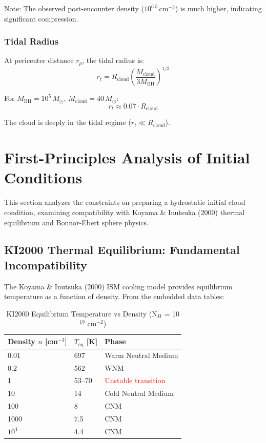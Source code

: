 \documentclass[11pt,a4paper]{article}
\newcommand{\Msun}{M_\odot}
\newcommand{\cmcubed}{\,\mathrm{cm^{-3}}}
\begin{document}
Note: The observed post-encounter density ($10^{6.5}\cmcubed$) is much higher, indicating significant compression.

\subsubsection{Tidal Radius}
At pericenter distance $r_p$, the tidal radius is:
\begin{equation}
    r_t = R_\mathrm{cloud} \left(\frac{M_\mathrm{cloud}}{3 M_\mathrm{BH}}\right)^{1/3}
\end{equation}

For $M_\mathrm{BH} = 10^5\,\Msun$, $M_\mathrm{cloud} = 40\,\Msun$:
\begin{equation}
    r_t \approx 0.07 \cdot R_\mathrm{cloud}
\end{equation}

The cloud is deeply in the tidal regime ($r_t \ll R_\mathrm{cloud}$).

\section{First-Principles Analysis of Initial Conditions}

This section analyzes the constraints on preparing a hydrostatic initial cloud
condition, examining compatibility with Koyama \& Inutsuka (2000) thermal
equilibrium and Bonnor-Ebert sphere physics.

\subsection{KI2000 Thermal Equilibrium: Fundamental Incompatibility}

The Koyama \& Inutsuka (2000) ISM cooling model provides equilibrium temperature
as a function of density. From the embedded data tables:

\begin{table}[h]
\centering
\caption{KI2000 Equilibrium Temperature vs Density (N$_H$ = 10$^{19}$ cm$^{-2}$)}
\begin{tabular}{lll}
\toprule
\textbf{Density $n$ [cm$^{-3}$]} & \textbf{$T_\mathrm{eq}$ [K]} & \textbf{Phase} \\
\midrule
0.01 & 697 & Warm Neutral Medium \\
0.2 & 562 & WNM \\
1 & 53--70 & \textcolor{red}{Unstable transition} \\
10 & 14 & Cold Neutral Medium \\
100 & 8 & CNM \\
1000 & 7.5 & CNM \\
$10^4$ & 4.4 & CNM \\
\bottomrule
\end{tabular}
\end{table}
\end{document}
